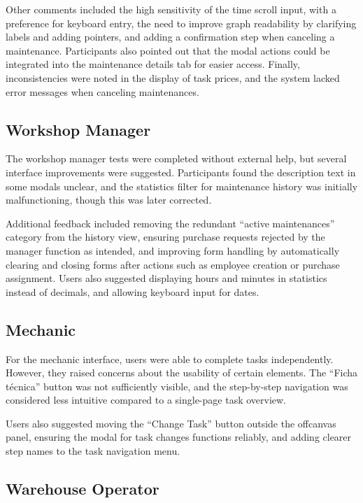 Other comments included the high sensitivity of the time scroll input, with a preference for keyboard entry, the need to improve graph readability by clarifying labels and adding pointers, and adding a confirmation step when canceling a maintenance. Participants also pointed out that the modal actions could be integrated into the maintenance details tab for easier access. Finally, inconsistencies were noted in the display of task prices, and the system lacked error messages when canceling maintenances.

\subsection{Workshop Manager}

The workshop manager tests were completed without external help, but several interface improvements were suggested. Participants found the description text in some modals unclear, and the statistics filter for maintenance history was initially malfunctioning, though this was later corrected.

Additional feedback included removing the redundant “active maintenances” category from the history view, ensuring purchase requests rejected by the manager function as intended, and improving form handling by automatically clearing and closing forms after actions such as employee creation or purchase assignment. Users also suggested displaying hours and minutes in statistics instead of decimals, and allowing keyboard input for dates.

\subsection{Mechanic}

For the mechanic interface, users were able to complete tasks independently. However, they raised concerns about the usability of certain elements. The “Ficha técnica” button was not sufficiently visible, and the step-by-step navigation was considered less intuitive compared to a single-page task overview.

Users also suggested moving the “Change Task” button outside the offcanvas panel, ensuring the modal for task changes functions reliably, and adding clearer step names to the task navigation menu.

\subsection{Warehouse Operator}

